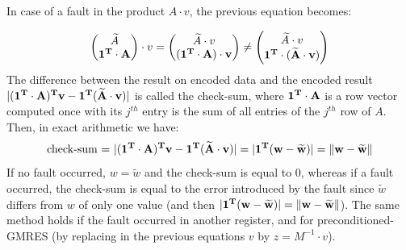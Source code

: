 \documentclass[twoside]{article}
\begin{document}
  In case of a fault in the product $A \cdot v$, the previous equation becomes:

  \begin{equation}
    \begin{pmatrix}
      \widetilde{A}  \\
      \bf{1}^T \cdot A 
    \end{pmatrix} \cdot
    v
    =  \begin{pmatrix}
      \widetilde{A} \cdot v \\
      (\bf{1}^T \cdot A) \cdot v
    \end{pmatrix} 
    \neq  \begin{pmatrix}
      \widetilde{A} \cdot v \\
      \bf{1}^T \cdot (\widetilde{A} \cdot v)
    \end{pmatrix} 
  \end{equation}
  The difference between the result on encoded data and the encoded result $|(\bf{1}^T \cdot A)^T v - \bf{1}^T (\widetilde{A} \cdot v)|$ is called the check-sum,
  where $\bf{1}^T \cdot A$ is a row vector computed once with  its $j^{th}$ entry is the sum of all entries of the $j^{th}$ row of $A$.
  Then, in exact arithmetic we have: 
  \begin{equation} \label{eqn:checksum}
    \text{check-sum = } |(\bf{1}^T \cdot A)^T  v - \bf{1}^T (\widetilde{A} \cdot v)| = |\bf{1}^T (w-\widetilde{w})| = \|w - \widetilde{w}\|
  \end{equation}
  If no fault occurred, $w = \widetilde{w}$ and the check-sum is equal to 0, whereas if a fault occurred, the check-sum is equal to the error introduced by the fault since $\widetilde{w}$ differs from $w$ of only one value (and then $|\bf{1}^T(w - \widetilde{w})| = \|w - \widetilde{w}\|$). The same method holds if the fault occurred in another register, and for preconditioned-GMRES (by replacing in the previous equations $v$ by $z = M^{-1} \cdot v$). 
\end{document}
